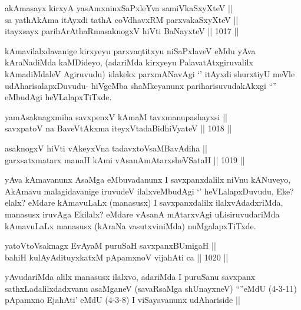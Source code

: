 
\begin{shl}
akAmasayx kirxyA yasAmxninxSaPxleYva samiVkaSxyXteV || \\
sa yathAkAma itAyxdi tathA coVdhavxRM parxvakaSxyXteV || \\
itayxsayx parihArAthaRmasaknogxV hiVti BaNayxteV ||  1017 ||  
\end{shl}

\begin{artha}
kAmavilalxdavanige kirxyeyu parxvaqtitxyu niSaPxlaveV eMdu yAva kAraNadiMda kaMDideyo, (adariMda kirxyeyu PalavatAtxgiruvalilx kAmadiMdaleV Agiruvudu) idakekx parxmANavAgi `\stext' itAyxdi shurxtiyU meVle udAharisalapxDuvudu- hiVgeMba shaMkeyanunx pariharisuvudakAkxgi ``\stext'' eMbudAgi heVLalapxTiTxde.
\end{artha}


\begin{shl}
yamAsaknagxmiha savxpenxV kAmaM tavxmanupashayxsi || \\
savxpatoV na BaveVtAkxma iteyxVtadaBidhiVyateV ||  1018 ||  
\end{shl}
				
\begin{shl}
asaknogxV hiVti vAkeyxVna tadavxtoV\s saMBavAdiha || \\
garxsatxmatarx manaH kAmi vAsanAmAtarxsheVSataH ||  1019 ||  
\end{shl}

\begin{artha}
yAva kAmavanunx AsaMga eMbuvadanunx I savxpanxdalilx niVnu kANuveyo, AkAmavu malagidavanige iruvudeV ilalxveMbudAgi `\stext' heVLalapxDuvudu, Eke? elalx? eMdare kAmavuLaLx (manasusx) I savxpanxdalilx ilalxvAdadxriMda, manasusx iruvAga Ekilalx? eMdare vAsanA mAtarxvAgi uLisiruvudariMda kAmavuLaLx manasusx (kAraNa vasutxviniMda) nuMgalapxTiTxde.
\end{artha}

\begin{shl}
yatoV\s toV\s saknagx EvAyaM puruSaH savxpanxBUmigaH || \\
bahiH kulAyAdituyxkatxM pApamxnoV vijahAti ca ||  1020 ||  
\end{shl}

\begin{artha}
yAvudariMda alilx manasusx ilalxvo, adariMda I puruSanu savxpanx sathxLadalilxdadxvanu asaMganeV (savaRsaMga shUnayxneV) ``\stext''eMdU (4-3-11) pApamxno Eja{hA}ti' eMdU (4-3-8) I viSayavanunx udAhariside ||
\end{artha}

